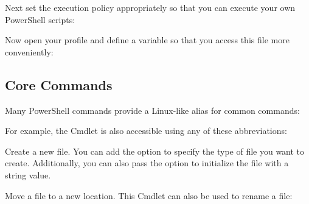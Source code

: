 \begin{flushleft}
	Next set the execution policy appropriately so that you can execute your own
	PowerShell scripts:
\end{flushleft}

\begin{flushleft}
\end{flushleft}

\begin{flushleft}
	Now open your profile and define a  variable so that you access
	this file more conveniently:
\end{flushleft}

\begin{flushleft}
\end{flushleft}

\subsection{Core Commands}\label{powershell-core-commands}

\begin{flushleft}
	Many PowerShell commands provide a Linux-like alias for common commands:
\end{flushleft}

\begin{flushleft}
\end{flushleft}

\begin{flushleft}
	For example, the  Cmdlet is also accessible using any of
	these abbreviations:
	\textcolor{gray}{{\small}}
\end{flushleft}

\begin{flushleft}
	Create a new file. You can add the  option to
	specify the type of file you want to create. Additionally, you can also pass
	the  option to initialize the file with a string value.
\end{flushleft}

\begin{flushleft}
\end{flushleft}

\begin{flushleft}
	Move a file to a new location. This Cmdlet can also be used to rename a file:
\end{flushleft}

